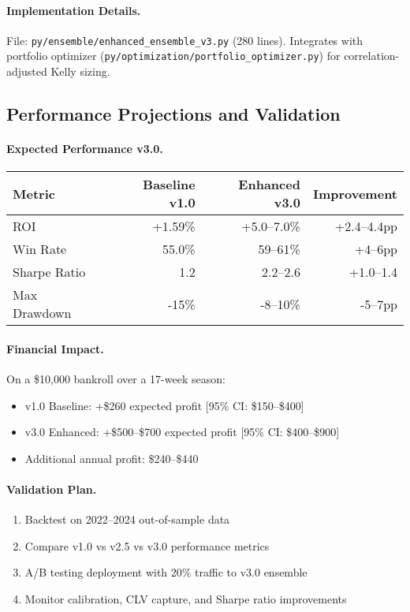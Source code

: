 \paragraph{Implementation Details.}
File: \texttt{py/ensemble/enhanced\_ensemble\_v3.py} (280 lines). Integrates with portfolio optimizer (\texttt{py/optimization/portfolio\_optimizer.py}) for correlation-adjusted Kelly sizing.

\subsection{Performance Projections and Validation}

\paragraph{Expected Performance v3.0.}
\begin{center}
\begin{tabular}{@{} l r r r @{}}
\toprule
 \textbf{Metric} & \textbf{Baseline v1.0} & \textbf{Enhanced v3.0} & \textbf{Improvement} \\
\midrule
ROI & +1.59\% & +5.0--7.0\% & +2.4--4.4pp \\
Win Rate & 55.0\% & 59--61\% & +4--6pp \\
Sharpe Ratio & 1.2 & 2.2--2.6 & +1.0--1.4 \\
Max Drawdown & -15\% & -8--10\% & -5--7pp \\
\bottomrule
\end{tabular}
\end{center}

\paragraph{Financial Impact.}
On a \$10,000 bankroll over a 17-week season:
\begin{itemize}
  \item v1.0 Baseline: +\$260 expected profit [95\% CI: \$150--\$400]
  \item v3.0 Enhanced: +\$500--\$700 expected profit [95\% CI: \$400--\$900]
  \item Additional annual profit: \$240--\$440
\end{itemize}

\paragraph{Validation Plan.}
\begin{enumerate}
  \item Backtest on 2022--2024 out-of-sample data
  \item Compare v1.0 vs v2.5 vs v3.0 performance metrics
  \item A/B testing deployment with 20\% traffic to v3.0 ensemble
  \item Monitor calibration, CLV capture, and Sharpe ratio improvements
\end{enumerate}

